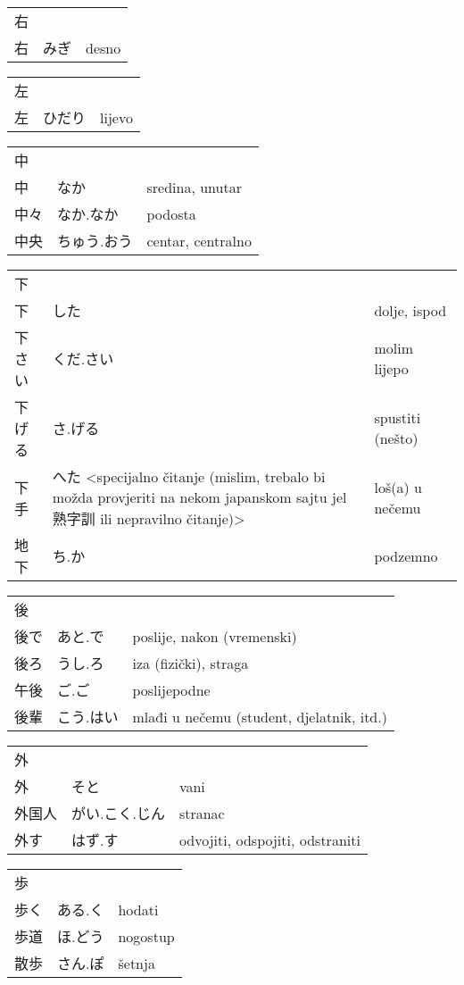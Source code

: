 

\newenvironment{dictentry}[1]{
	\begin{tabular}{p{2cm} p{3cm} p{10cm}}
		#1 &&\\
}{
	\end{tabular}
	\vspace{20pt}
}

\newcommand{\example}[3]{
	\hspace*{\fill}#1 & #2 & #3\\
}

\author{ロボット君}


\begin{dictentry}{右}
\example{右}{みぎ}{desno}
\end{dictentry}

\begin{dictentry}{左}
\example{左}{ひだり}{lijevo}
\end{dictentry}

\begin{dictentry}{中}
\example{中}{なか}{sredina, unutar}
\example{中々}{なか.なか}{podosta}
\example{中央}{ちゅう.おう}{centar, centralno}
\end{dictentry}

\begin{dictentry}{下}
\example{下}{した}{dolje, ispod}
\example{下さい}{くだ.さい}{molim lijepo}
\example{下げる}{さ.げる}{spustiti (nešto)}
\example{下手}{へた <specijalno čitanje (mislim, trebalo bi možda provjeriti na nekom japanskom sajtu jel 熟字訓 ili nepravilno čitanje)>}{loš(a) u nečemu}
\example{地下}{ち.か}{podzemno}
\end{dictentry}

\begin{dictentry}{後}
\example{後で}{あと.で}{poslije, nakon (vremenski)}
\example{後ろ}{うし.ろ}{iza (fizički), straga}
\example{午後}{ご.ご}{poslijepodne}
\example{後輩}{こう.はい}{mlađi u nečemu (student, djelatnik, itd.)}
\end{dictentry}

\begin{dictentry}{外}
\example{外}{そと}{vani}
\example{外国人}{がい.こく.じん}{stranac}
\example{外す}{はず.す}{odvojiti, odspojiti, odstraniti}
\end{dictentry}

\begin{dictentry}{歩}
\example{歩く}{ある.く}{hodati}
\example{歩道}{ほ.どう}{nogostup}
\example{散歩}{さん.ぽ}{šetnja}
\end{dictentry}

